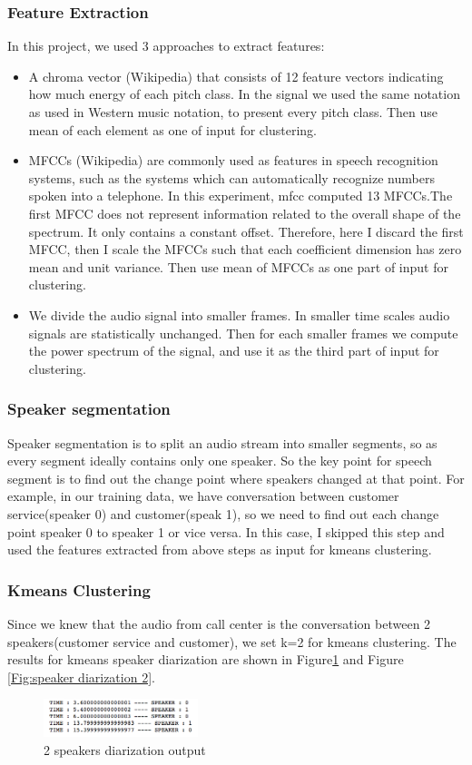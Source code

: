 \documentclass[journal, a4paper]{IEEEtran}
\begin{document}
\subsubsection{Feature Extraction}
In this project, we used 3 approaches to extract features:
\begin{itemize}
    \item A chroma vector (Wikipedia) that consists of 12 feature vectors indicating how much energy of each pitch class. In the signal we used the same notation as used in Western music notation, to present every pitch class. Then use mean of each element as one of input for clustering.
    \item MFCCs (Wikipedia) are commonly used as features in speech recognition systems, such as the systems which can automatically recognize numbers spoken into a telephone. In this experiment, mfcc computed 13 MFCCs.The first MFCC does not represent information related to the overall shape of the spectrum. It only contains a constant offset. Therefore, here I discard the first MFCC, then I scale the MFCCs such that each coefficient dimension has zero mean and unit variance. Then use mean of MFCCs as one part of input for clustering.
    \item We divide the audio signal into smaller frames. In smaller time scales audio signals are statistically unchanged. Then for each smaller frames we compute the power spectrum of the signal, and use it as the third part of input for clustering.
\end{itemize}
\subsubsection{Speaker segmentation}\cite{Segmentation} Speaker segmentation is to split an audio stream into smaller segments, so as every segment ideally contains only one speaker. So the key point for speech segment is to find out the change point where speakers changed at that point. For example, in our training data, we have conversation between customer service(speaker 0) and customer(speak 1), so we need to find out each change point speaker 0 to speaker 1 or vice versa. In this case, I skipped this step and used the features extracted from above steps as input for kmeans clustering.
\subsubsection{Kmeans Clustering}
Since we knew that the audio from call center is the conversation between 2 speakers(customer service and customer), we set k=2 for kmeans clustering. The results for kmeans speaker diarization are shown in Figure\ref{Fig:speaker diarization 1} and Figure \ref{Fig:speaker diarization 2}.
\begin{figure}[h!]
    \centering  
     \caption{\label{Fig:speaker diarization 1}2 speakers diarization output}  
    \includegraphics[width=0.4\textwidth]{kmeans01.png} 
\end{figure}
\end{document}

